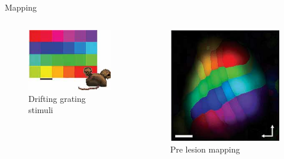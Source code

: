 \begin{frame}{Mapping}
  \begin{columns}[c]
    \begin{column}{0.4\textwidth}
      \begin{figure}
        \includegraphics[keepaspectratio,width=\textwidth]{99_images/keck-1-1a}
        \caption{Drifting grating stimuli}
      \end{figure}
    \end{column}
    \pause
    \begin{column}{0.4\textwidth}
      \begin{figure}
        \includegraphics[keepaspectratio,width=\textwidth]{99_images/keck-1-1c}
        \caption{Pre lesion mapping}
      \end{figure}
    \end{column}
  \end{columns}
\end{frame}
